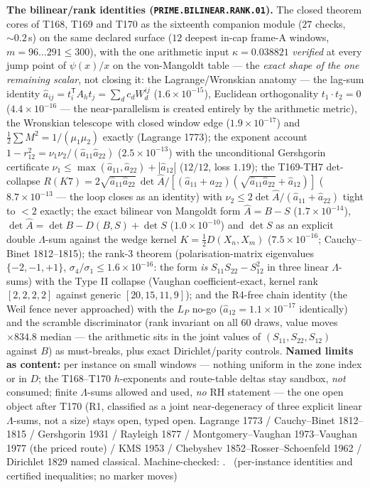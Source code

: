 \par\smallskip\noindent\textbf{The bilinear/rank identities
(\texttt{PRIME.BILINEAR.RANK.01}).}
The closed theorem cores of T168, T169 and T170 as the sixteenth
companion module ($27$ checks, ${\sim}0.2$\,s) on the same declared
surface ($12$ deepest in-cap frame-A windows, $m=96\ldots291\le300$),
with the one arithmetic input $\kappa=0.038821$ \emph{verified} at every
jump point of $\psi(x)/x$ on the von-Mangoldt table --- the \emph{exact
shape of the one remaining scalar}, not closing it: the
Lagrange/Wronskian anatomy --- the lag-sum identity
$\hat a_{ij}=t_i^{\mathsf T}A_ht_j=\sum_d c_dW^{ij}_d$
($1.6\times10^{-15}$), Euclidean orthogonality $t_1\cdot t_2=0$
($4.4\times10^{-16}$ --- the near-parallelism is created entirely by the
arithmetic metric), the Wronskian telescope with closed window edge
($1.9\times10^{-17}$) and $\tfrac12\sum M^2=1/(\mu_1\mu_2)$ exactly
(Lagrange 1773); the exponent account
$1-r_{12}^2=\nu_1\nu_2/(\hat a_{11}\hat a_{22})$ ($2.5\times10^{-13}$)
with the unconditional Gershgorin certificate
$\nu_1\le\max(\hat a_{11},\hat a_{22})+|\hat a_{12}|$ ($12/12$, loss
$1.19$); the T169-TH7 det-collapse
$R(K7)=2\sqrt{\hat a_{11}\hat a_{22}}\,\det\hat A/[(\hat a_{11}+
\hat a_{22})(\sqrt{\hat a_{11}\hat a_{22}}+\hat a_{12})]$
($8.7\times10^{-13}$ --- the loop closes as an identity) with
$\nu_2\le2\det\hat A/(\hat a_{11}+\hat a_{22})$ tight to $<2$ exactly;
the exact bilinear von Mangoldt form $\hat A=B-S$
($1.7\times10^{-14}$), $\det\hat A=\det B-D(B,S)+\det S$
($1.0\times10^{-10}$) and $\det S$ as an explicit double $\Lambda$-sum
against the wedge kernel $K=\tfrac12D(X_n,X_m)$ ($7.5\times10^{-16}$;
Cauchy--Binet 1812--1815); the rank-3 theorem (polarisation-matrix
eigenvalues $\{-2,-1,+1\}$, $\sigma_4/\sigma_1\le1.6\times10^{-16}$: the
form \emph{is} $S_{11}S_{22}-S_{12}^2$ in three linear $\Lambda$-sums)
with the Type II collapse (Vaughan coefficient-exact, kernel rank
$[2,2,2,2]$ against generic $[20,15,11,9]$); and the R4-free chain
identity (the Weil fence never approached) with the $L_P$ no-go
($\hat a_{12}=1.1\times10^{-17}$ identically) and the scramble
discriminator (rank invariant on all $60$ draws, value moves
$\times834.8$ median --- the arithmetic sits in the joint values of
$(S_{11},S_{22},S_{12})$ against $B$) as must-breaks, plus exact
Dirichlet/parity controls.
\textbf{Named limits as content:} per instance on small windows ---
nothing uniform in the zone index or in $D$; the T168--T170 $h$-exponents
and route-table deltas stay sandbox, \emph{not} consumed; finite
$\Lambda$-sums allowed and used, \emph{no} RH statement --- the one open
object after T170 (R1, classified as a joint near-degeneracy of three
explicit linear $\Lambda$-sums, not a size) stays open, typed open.
Lagrange 1773 / Cauchy--Binet 1812--1815 / Gershgorin 1931 / Rayleigh
1877 / Montgomery--Vaughan 1973--Vaughan 1977 (the priced route) / KMS
1953 / Chebyshev 1852--Rosser--Schoenfeld 1962 / Dirichlet 1829 named
classical. Machine-checked:
.
\mE\ (per-instance identities and certified inequalities; no marker moves)
\par\smallskip



